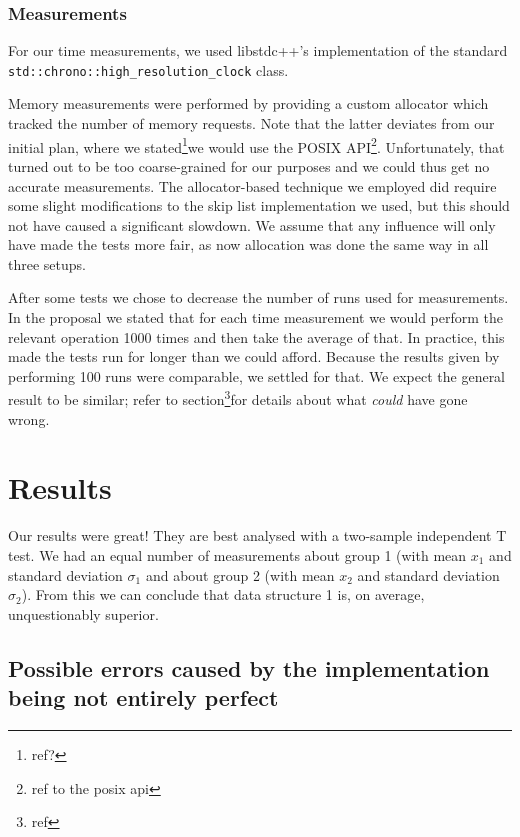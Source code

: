 \documentclass[12pt,a4paper]{article}
\begin{document}
	\subsubsection*{Measurements}
    For our time measurements, we used libstdc++'s implementation of the standard
    \texttt{std::chrono::high\_resolution\_clock} class.
    
    Memory measurements were performed by providing a custom allocator which tracked the number of memory
    requests.  Note that the latter deviates from our initial plan, where we stated\footnote{ref?}we would
    use the POSIX API\footnote{ref to the posix api}.  Unfortunately, that turned out to be too
    coarse-grained for our purposes and we could thus get no accurate measurements.  The
    allocator-based technique we employed did require some slight modifications to the skip list
    implementation we used, but this should not have caused a significant slowdown. We assume that any 
    influence will only have made the tests more fair, as now allocation was done the same way in all 
    three setups.

    After some tests we chose to decrease the number of runs used for measurements.  In the
    proposal we stated that for each time measurement we would perform the relevant operation 1000
    times and then take the average of that.  In practice, this made the tests run for longer than
    we could afford. Because the results given by performing 100 runs were comparable, we settled for that.  
    We expect the general result to be similar; refer to section\footnote{ref}for details
    about what \emph{could} have gone wrong.

    \section{Results}

    Our results were great!  They are best analysed with a two-sample independent T test.  We had an
    equal number of measurements about group 1 (with mean $x_1$ and standard deviation $\sigma_1$ and
    about group 2 (with mean $x_2$ and standard deviation $\sigma_2$).  From this we can conclude that
    data structure 1 is, on average, unquestionably superior.

    \subsection{Possible errors caused by the implementation being not entirely perfect}
\end{document}
